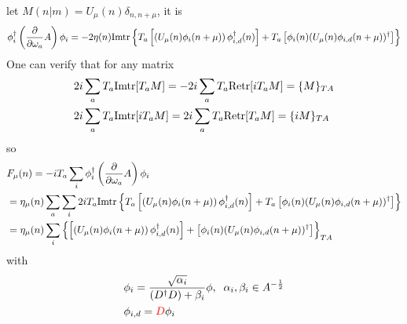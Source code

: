 let $M(n|m)=U_{\mu}(n) \delta _{n,n+\mu}$, it is
\begin{equation}
\begin{split}
&\phi _i^{\dagger}\left(\frac{\partial }{\partial \omega _a}A\right)\phi _i = -2\eta (n) {\rm Imtr}\left\{T_a  \left[\left(U_{\mu}(n)\phi _i(n+\mu)\right)\phi _{i,d}^{\dagger}(n)\right]+T_a \left[\phi _i(n)(U_{\mu}(n)\phi _{i,d}(n+\mu))^{\dagger}\right]\right\}\\
\end{split}
\end{equation}
One can verify that for any matrix \textcolor[rgb]{0,0,1}{
\begin{equation}
\begin{split}
&2i \sum _a T_a {\rm Im tr}[T_a M] = -2 i \sum _a T_a {\rm Re tr}[i T_a M] = \{M\}_{TA}\\
&2i \sum _a T_a {\rm Im tr}[i T_a M] = 2 i \sum _a T_a {\rm Re tr}[T_a M] = \{i M\}_{TA}\\
\end{split}
\end{equation}
}
so
\begin{equation}
\begin{split}
&F_{\mu}(n)=-iT_a \sum _i \phi _{i}^{\dagger} \left(\frac{\partial }{\partial \omega _a} A \right) \phi _{i}\\
&=\eta _{\mu}(n) \sum _a \sum _i 2i T_a{\rm Imtr}\left\{T_a  \left[\left(U_{\mu}(n)\phi _i(n+\mu)\right)\phi _{i,d}^{\dagger}(n)\right]+T_a \left[\phi _i(n)(U_{\mu}(n)\phi _{i,d}(n+\mu))^{\dagger}\right]\right\}\\
&=\eta _{\mu}(n) \sum _i \left\{\left[\left(U_{\mu}(n)\phi _i(n+\mu)\right)\phi _{i,d}^{\dagger}(n)\right]+\left[\phi _i(n)(U_{\mu}(n)\phi _{i,d}(n+\mu))^{\dagger}\right]\right\}_{TA}
\end{split}
\label{eq.staggeredformnf2}
\end{equation}
with
\begin{equation}
\begin{split}
&\phi _i = \frac{\sqrt{\alpha _i} }{(D^{\dagger}D)+\beta _i} \phi,\;\;\alpha _i,\beta _i \in A^{-\frac{1}{2}}\\
&\phi _{i,d}=\textcolor[rgb]{1,0,0}{D}\phi _i\\
\end{split}
\end{equation}

